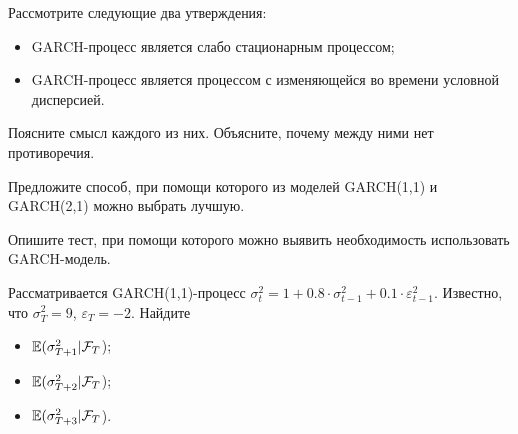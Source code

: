\begin{problem}
Рассмотрите следующие два утверждения:
\begin{itemize}
  \item GARCH-процесс является слабо стационарным процессом;
  \item GARCH-процесс является процессом с изменяющейся во времени условной дисперсией.
\end{itemize}
Поясните смысл каждого из них. Объясните, почему между ними нет противоречия.
\begin{sol}
\end{sol}
\end{problem}




\begin{problem}
Предложите способ, при помощи которого из моделей GARCH(1,1) и GARCH(2,1) можно выбрать лучшую.
\begin{sol}
\end{sol}
\end{problem}


\begin{problem}
Опишите тест, при помощи которого можно выявить необходимость использовать GARCH-модель.
\begin{sol}
\end{sol}
\end{problem}




\begin{problem}
Рассматривается GARCH(1,1)-процесс $\sigma_t^2 = 1 + 0.8 \cdot \sigma_{t-1}^2 + 0.1 \cdot \varepsilon_{t-1}^2$. Известно, что $\sigma_T^2 = 9$, $\varepsilon_T = -2$. Найдите
\begin{itemize}
  \item $\mathbb{E}(\sigma_{T+1}^2|\mathcal{F}_T$);
  \item $\mathbb{E}(\sigma_{T+2}^2|\mathcal{F}_T$);
  \item $\mathbb{E}(\sigma_{T+3}^2|\mathcal{F}_T$).
\end{itemize}


\begin{sol}
\end{sol}
\end{problem}




